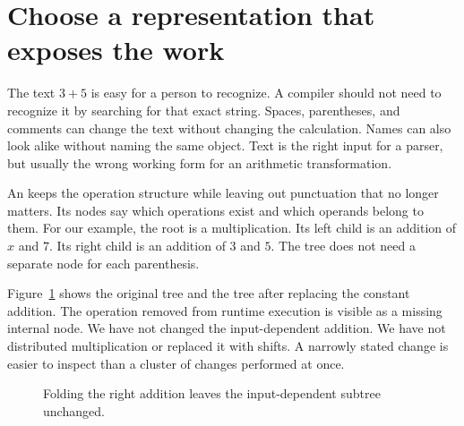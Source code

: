 \section{Choose a representation that exposes the work}
\label{sec:expression-representation}

The text $3+5$ is easy for a person to recognize.
A compiler should not need to recognize it by searching for that exact string.
Spaces, parentheses, and comments can change the text without changing the calculation.
Names can also look alike without naming the same object.
Text is the right input for a parser, but usually the wrong working form for an arithmetic transformation.

An  keeps the operation structure while leaving out punctuation that no longer matters.
Its nodes say which operations exist and which operands belong to them.
For our example, the root is a multiplication.
Its left child is an addition of $x$ and $7$.
Its right child is an addition of $3$ and $5$.
The tree does not need a separate node for each parenthesis.

Figure~\ref{fig:tiny-before-after} shows the original tree and the tree after replacing the constant addition.
The operation removed from runtime execution is visible as a missing internal node.
We have not changed the input-dependent addition.
We have not distributed multiplication or replaced it with shifts.
A narrowly stated change is easier to inspect than a cluster of changes performed at once.

\begin{figure}
  \centering
  \caption{Folding the right addition leaves the input-dependent subtree unchanged.}
  \label{fig:tiny-before-after}
\end{figure}

